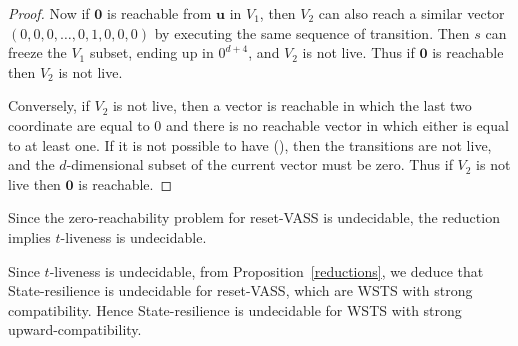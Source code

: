 \begin{proof}
Now if $\textbf{0}$ is reachable from $\textbf{u}$ in $V_1$, then $V_2$ can also reach a similar
vector $(0,0,0,\ldots, 0, 1,0,0,0)$ by executing the same sequence of transition.
Then $s$ can freeze the $V_1$ subset,
ending up in $0^{d+4}$, and $V_2$ is not live.
Thus if $\textbf{0}$ is reachable then $V_2$ is not live.


Conversely, if $V_2$ is not live, then a vector is reachable in which the last two coordinate are equal to $0$ and there is no reachable vector in which either is equal to at least one.
If it is not possible to have (), then the transitions are not live, and the
$d$-dimensional subset of the current vector must be zero.
Thus if $V_2$ is not live then 
$\textbf{0}$ is reachable.
\end{proof}


Since the zero-reachability problem for reset-VASS is undecidable, the reduction implies 
%
%
{\sc %
$t$-liveness} is undecidable.

Since {\sc $t$-liveness} is undecidable, from Proposition~\ref{reductions},  we deduce that {\sc State-resilience} is undecidable  for reset-VASS, which are WSTS with strong compatibility. Hence {\sc State-resilience} is undecidable  for WSTS with strong upward-compatibility. %








